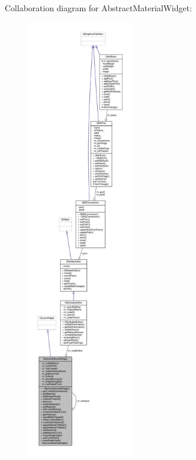Collaboration diagram for Abstract\-Material\-Widget\-:
\nopagebreak
\begin{figure}[H]
\begin{center}
\leavevmode
\includegraphics[height=550pt]{class_abstract_material_widget__coll__graph}
\end{center}
\end{figure}
